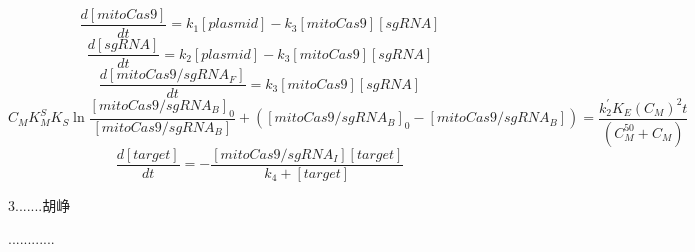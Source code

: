 \documentclass[UTF8]{ctexart}%
\begin{document}
	\begin{equation}
	\frac{d[mitoCas9]}{dt}=k_1[plasmid]-k_3[mitoCas9][sgRNA]\tag{1}
	\end{equation}
	\begin{equation}
	\frac{d[sgRNA]}{dt}=k_2[plasmid]-k_3[mitoCas9][sgRNA]\tag{2}
	\end{equation}
	\begin{equation}
	\frac{d[mitoCas9/sgRNA_F]}{dt}=k_3[mitoCas9][sgRNA]\tag{3}
	\end{equation}
	\begin{equation}
	C_MK_M^SK_S\ln\frac{[mitoCas9/sgRNA_B]_0}{[mitoCas9/sgRNA_B]}+([mitoCas9/sgRNA_B]_0-[mitoCas9/sgRNA_B])=\frac{k_2^{'}K_E(C_M)^2\tag{4} t}{(C_M^{50}+C_M)}
	\end{equation}
	\begin{equation}
	\frac{d[target]}{dt}=-\frac{[mitoCas9/sgRNA_I][target]}{k_4+[target]}\tag{5}
	\end{equation}
	\begin{center}
	{\Large 3.......胡峥}
	\end{center}
............
\end{document}
